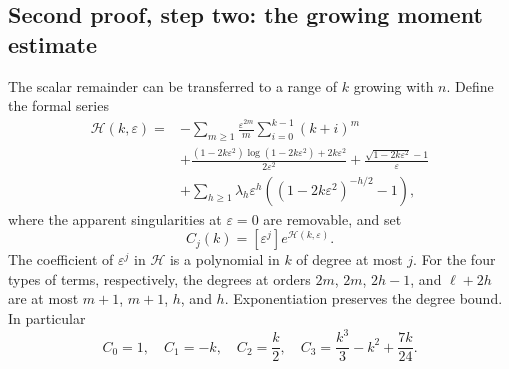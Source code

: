 \documentclass[11pt,letterpaper]{article}
\theoremstyle{remark}\newtheorem{remark}[theorem]{Remark}
\newcommand{\eps}{\varepsilon}\newcommand{\Pois}{\operatorname{Poisson}}
\begin{document}
\subsection{Second proof, step two: the growing moment estimate}\label{fdi:adj:sec:uniform}
The scalar remainder can be transferred to a range of $k$ growing with $n$. Define the formal series
\begin{align}
 \mathcal H(k,\eps)={}&-\sum_{m\ge1}\frac{\eps^{2m}}m\sum_{i=0}^{k-1}(k+i)^m\nonumber\\
 &+\frac{(1-2k\eps^2)\log(1-2k\eps^2)+2k\eps^2}{2\eps^2}
   +\frac{\sqrt{1-2k\eps^2}-1}{\eps}\label{fdi:adj:eq:H}\\
 &+\sum_{h\ge1}\lambda_h\eps^h\left((1-2k\eps^2)^{-h/2}-1\right),\nonumber
\end{align}
where the apparent singularities at $\eps=0$ are removable, and set
\begin{equation}\label{fdi:adj:eq:C}
 C_j(k)=[\eps^j]e^{\mathcal H(k,\eps)}.
\end{equation}
The coefficient of $\eps^j$ in $\mathcal H$ is a polynomial in $k$ of degree at most $j$. For the four types of terms, respectively, the degrees at orders $2m$, $2m$, $2h-1$, and $\ell+2h$ are at most $m+1$, $m+1$, $h$, and $h$. Exponentiation preserves the degree bound. In particular
\[
 C_0=1,\quad C_1=-k,\quad C_2=\frac k2,\quad
 C_3=\frac{k^3}{3}-k^2+\frac{7k}{24}.
\]
\end{document}
